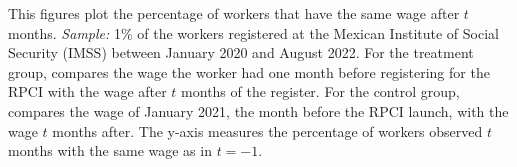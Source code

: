 \documentclass[oneside,11pt]{article}
\begin{document}
\scriptsize{
\noindent This figures plot the percentage of workers that have the same wage after $t$ months. \textit{Sample:} 1\% of the workers registered at the Mexican Institute of Social Security (IMSS) between January 2020 and August 2022. For the treatment group, compares the wage the worker had one month before registering for the RPCI with the wage after $t$ months of the register. For the control group, compares the wage of January 2021, the month before the RPCI launch, with the wage $t$ months after. The y-axis measures the percentage of workers observed $t$ months with the same wage as in $t = -1$.
}

\clearpage
\end{document}
